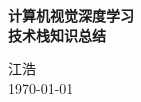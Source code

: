 \documentclass[12pt, a4paper, UTF8, fontset=adobe, oneside]{ctexbook} %
\begin{document}
\frontmatter
\begin{titlepage}
\begin{center}

\vspace*{5cm}
{\huge \bfseries 计算机视觉深度学习}\\[0.4cm]
{\huge \bfseries 技术栈知识总结}\\[0.4cm]

\vspace{12cm}

{\large 江浩} \\[1cm]
{\large \today}

\end{center}
\end{titlepage}

{
\hypersetup{linkcolor=black} %
\tableofcontents %
}

\mainmatter %









\end{document}
